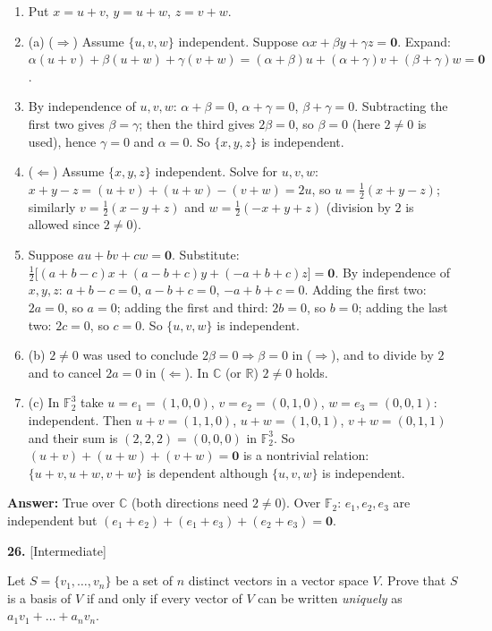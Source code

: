 \documentclass[11pt]{article}
\begin{document}
\begin{tcolorbox}[breakable,colback=ans,colframe=ansb,boxrule=0.5pt,left=4pt,right=4pt,top=2pt,bottom=2pt]\begin{enumerate}[leftmargin=3.1em,itemsep=1pt,topsep=1pt,label=\textbf{Step \arabic*.}]\item Put $x=u+v$, $y=u+w$, $z=v+w$.
\item (a) ($\Rightarrow$) Assume $\{u,v,w\}$ independent. Suppose $\alpha x+\beta y+\gamma z=\mathbf 0$. Expand: $\alpha(u+v)+\beta(u+w)+\gamma(v+w)=(\alpha+\beta)u+(\alpha+\gamma)v+(\beta+\gamma)w=\mathbf 0$.
\item By independence of $u,v,w$: $\alpha+\beta=0$, $\alpha+\gamma=0$, $\beta+\gamma=0$. Subtracting the first two gives $\beta=\gamma$; then the third gives $2\beta=0$, so $\beta=0$ (here $2\neq0$ is used), hence $\gamma=0$ and $\alpha=0$. So $\{x,y,z\}$ is independent.
\item ($\Leftarrow$) Assume $\{x,y,z\}$ independent. Solve for $u,v,w$: $x+y-z=(u+v)+(u+w)-(v+w)=2u$, so $u=\tfrac12(x+y-z)$; similarly $v=\tfrac12(x-y+z)$ and $w=\tfrac12(-x+y+z)$ (division by $2$ is allowed since $2\neq0$).
\item Suppose $au+bv+cw=\mathbf 0$. Substitute: $\tfrac12\bigl[(a+b-c)x+(a-b+c)y+(-a+b+c)z\bigr]=\mathbf 0$. By independence of $x,y,z$: $a+b-c=0$, $a-b+c=0$, $-a+b+c=0$. Adding the first two: $2a=0$, so $a=0$; adding the first and third: $2b=0$, so $b=0$; adding the last two: $2c=0$, so $c=0$. So $\{u,v,w\}$ is independent.
\item (b) $2\neq0$ was used to conclude $2\beta=0\Rightarrow\beta=0$ in ($\Rightarrow$), and to divide by $2$ and to cancel $2a=0$ in ($\Leftarrow$). In $\mathbb{C}$ (or $\mathbb{R}$) $2\neq0$ holds.
\item (c) In $\mathbb{F}_2^{3}$ take $u=e_1=(1,0,0)$, $v=e_2=(0,1,0)$, $w=e_3=(0,0,1)$: independent. Then $u+v=(1,1,0)$, $u+w=(1,0,1)$, $v+w=(0,1,1)$ and their sum is $(2,2,2)=(0,0,0)$ in $\mathbb{F}_2^{3}$. So $(u+v)+(u+w)+(v+w)=\mathbf 0$ is a nontrivial relation: $\{u+v,u+w,v+w\}$ is dependent although $\{u,v,w\}$ is independent.
\end{enumerate}\textbf{Answer:} True over $\mathbb{C}$ (both directions need $2\neq0$). Over $\mathbb{F}_2$: $e_1,e_2,e_3$ are independent but $(e_1+e_2)+(e_1+e_3)+(e_2+e_3)=\mathbf 0$.\end{tcolorbox}
\par\vspace{2pt}
\begin{minipage}{\linewidth}\textbf{26.} \hfill{\scriptsize\color{ink}[Intermediate]}\par\nopagebreak Let $S=\{v_1,\dots,v_n\}$ be a set of $n$ distinct vectors in a vector space $V$. Prove that $S$ is a basis of $V$ if and only if every vector of $V$ can be written \emph{uniquely} as $a_1v_1+\dots+a_nv_n$.
\end{minipage}\par\nopagebreak
\end{document}
